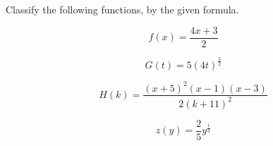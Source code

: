 \documentclass{ximera}
\author{Lee Wayand}
\begin{document}
\begin{example}




Classify the following functions, by the given formula.



\begin{question}


\[
f(x) = \frac{4x + 3}{2}
\]

\begin{multipleChoice}
\end{multipleChoice}


\end{question}











\begin{question}


\[
G(t) = 5 (4t)^{\tfrac{3}{2}}
\]

\begin{multipleChoice}
\end{multipleChoice}


\end{question}







\begin{question}


\[
H(k) = \frac{(x+5)^2 (x-1) (x-3)}{2(k + 11)^2}
\]

\begin{multipleChoice}
\end{multipleChoice}


\end{question}











\begin{question}


\[
z(y) = \frac{2}{5} y^{\tfrac{1}{3}}
\]


\end{question}
\end{example}
\end{document}
